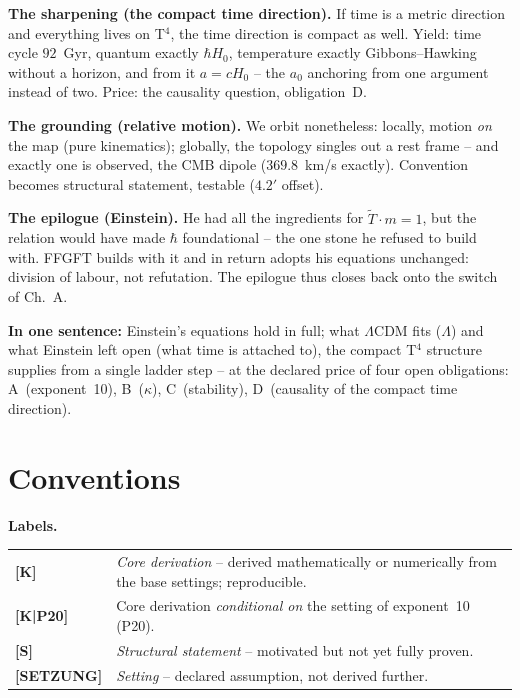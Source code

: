 \documentclass[11pt]{report}
\begin{document}
\textbf{The sharpening (the compact time direction).} If time is
a metric direction and everything lives on T$^4$, the time
direction is compact as well. Yield: time cycle $92$~Gyr, quantum
exactly $\hbar H_0$, temperature exactly Gibbons--Hawking without
a horizon, and from it $a = cH_0$ -- the $a_0$ anchoring from one
argument instead of two. Price: the causality question,
obligation~D.

\textbf{The grounding (relative motion).} We orbit nonetheless:
locally, motion \emph{on} the map (pure kinematics); globally,
the topology singles out a rest frame -- and exactly one is
observed, the CMB dipole ($369.8$~km/s exactly). Convention
becomes structural statement, testable ($4.2'$ offset).

\textbf{The epilogue (Einstein).} He had all the ingredients for
$\tilde T \cdot m = 1$, but the relation would have made $\hbar$
foundational -- the one stone he refused to build with. FFGFT
builds with it and in return adopts his equations unchanged:
division of labour, not refutation. The epilogue thus closes back
onto the switch of Ch.~A.

\medskip
\noindent\textbf{In one sentence:} Einstein's equations hold in
full; what $\Lambda$CDM fits ($\Lambda$) and what Einstein left
open (what time is attached to), the compact T$^4$ structure
supplies from a single ladder step -- at the declared price of
four open obligations: A~(exponent~10), B~($\kappa$),
C~(stability), D~(causality of the compact time direction).

\section*{Conventions}

\noindent\textbf{Labels.}

\medskip
\begin{tabular}{@{}lp{11cm}}
\textbf{[K]}       & \emph{Core derivation} -- derived mathematically
                     or numerically from the base settings; reproducible. \\[4pt]
\textbf{[K|P20]} & Core derivation \emph{conditional on} the
                     setting of exponent~10 (P20). \\[4pt]
\textbf{[S]}       & \emph{Structural statement} -- motivated but not
                     yet fully proven. \\[4pt]
\textbf{[SETZUNG]} & \emph{Setting} -- declared assumption, not
                     derived further. \\
\end{tabular}
\end{document}

